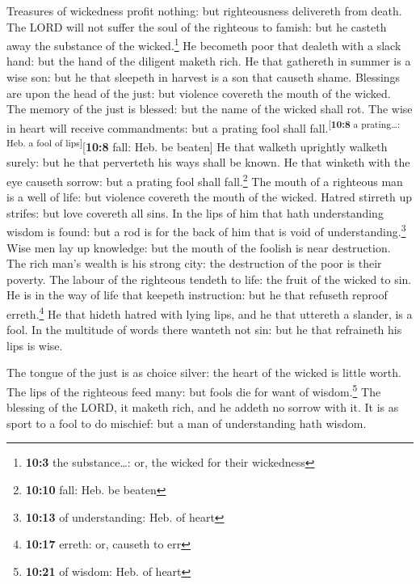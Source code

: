  Treasures of wickedness profit nothing: but righteousness
delivereth from death.  The LORD will not suffer the soul
of the righteous to famish: but he casteth away the substance of the
wicked.\footnote{\textbf{10:3} the substance\ldots: or, the wicked for
  their wickedness}  He becometh poor that dealeth with a
slack hand: but the hand of the diligent maketh rich.  He
that gathereth in summer is a wise son: but he that sleepeth in harvest
is a son that causeth shame.  Blessings are upon the head
of the just: but violence covereth the mouth of the wicked.
 The memory of the just is blessed: but the name of the
wicked shall rot.  The wise in heart will receive
commandments: but a prating fool shall
fall.\textsuperscript{{[}\textbf{10:8} a prating\ldots: Heb. a fool of
lips{]}}{[}\textbf{10:8} fall: Heb. be beaten{]}  He that
walketh uprightly walketh surely: but he that perverteth his ways shall
be known.  He that winketh with the eye causeth sorrow:
but a prating fool shall fall.\footnote{\textbf{10:10} fall: Heb. be
  beaten}  The mouth of a righteous man is a well of
life: but violence covereth the mouth of the wicked. 
Hatred stirreth up strifes: but love covereth all sins. 
In the lips of him that hath understanding wisdom is found: but a rod is
for the back of him that is void of understanding.\footnote{\textbf{10:13}
  of understanding: Heb. of heart}  Wise men lay up
knowledge: but the mouth of the foolish is near destruction.
 The rich man's wealth is his strong city: the
destruction of the poor is their poverty.  The labour of
the righteous tendeth to life: the fruit of the wicked to sin.
 He is in the way of life that keepeth instruction: but
he that refuseth reproof erreth.\footnote{\textbf{10:17} erreth: or,
  causeth to err}  He that hideth hatred with lying lips,
and he that uttereth a slander, is a fool.  In the
multitude of words there wanteth not sin: but he that refraineth his
lips is wise.

 The tongue of the just is as choice silver: the heart of
the wicked is little worth.  The lips of the righteous
feed many: but fools die for want of wisdom.\footnote{\textbf{10:21} of
  wisdom: Heb. of heart}  The blessing of the LORD, it
maketh rich, and he addeth no sorrow with it.  It is as
sport to a fool to do mischief: but a man of understanding hath wisdom.

